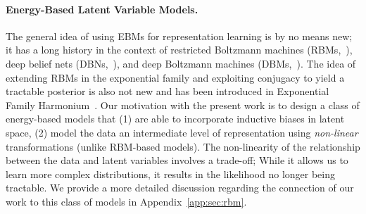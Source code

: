 \documentclass{article}
\begin{document}
\paragraph{Energy-Based Latent Variable Models.} The general idea of using EBMs for representation learning is by no means new; it has a long history in the context of restricted Boltzmann machines (RBMs,~\citep{smolensky1986information,hinton2002training}), deep belief nets (DBNs,~\cite{hinton2006fast}), and deep Boltzmann machines (DBMs,~\citep{salakhutdinov2009deep}). The idea of extending RBMs in the exponential family and exploiting conjugacy to yield a tractable posterior is also not new and has been introduced in Exponential Family Harmonium~\citep{welling2005exponential}. Our motivation with the present work is to design a class of energy-based models that (1) are able to incorporate inductive biases in latent space, (2) model the data an intermediate level of representation using \emph{non-linear} transformations (unlike RBM-based models). The non-linearity of the relationship between the data and latent variables involves a trade-off; While it allows us to learn more complex distributions, it results in the likelihood no longer being tractable. We provide a more detailed discussion regarding the connection of our work to this class of models in Appendix~\ref{app:sec:rbm}.  









\end{document}
